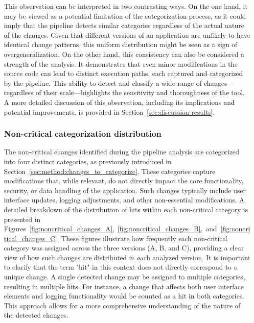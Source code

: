 This observation can be interpreted in two contrasting ways. On the one hand, it may be viewed as a potential limitation of the categorization process, as it could imply that the pipeline detects similar categories regardless of the actual nature of the changes. Given that different versions of an application are unlikely to have identical change patterns, this uniform distribution might be seen as a sign of overgeneralization.
On the other hand, this consistency can also be considered a strength of the analysis. It demonstrates that even minor modifications in the source code can lead to distinct execution paths, each captured and categorized by the pipeline. This ability to detect and classify a wide range of changes—regardless of their scale—highlights the sensitivity and thoroughness of the tool.
A more detailed discussion of this observation, including its implications and potential improvements, is provided in Section~\ref{sec:discussion-results}.








\subsubsection{Non-critical categorization distribution}
The non-critical changes identified during the pipeline analysis are categorized into four distinct categories, as previously introduced in Section~\ref{sec:method:changes_to_categorize}. These categories capture modifications that, while relevant, do not directly impact the core functionality, security, or data handling of the application. Such changes typically include user interface updates, logging adjustments, and other non-essential modifications.
A detailed breakdown of the distribution of hits within each non-critical category is presented in Figures~\ref{fig:noncritical_changes_A},~\ref{fig:noncritical_changes_B},~and~\ref{fig:noncritical_changes_C}. These figures illustrate how frequently each non-critical category was assigned across the three versions (A, B, and C), providing a clear view of how such changes are distributed in each analyzed version.
It is important to clarify that the term "hit" in this context does not directly correspond to a unique change. A single detected change may be assigned to multiple categories, resulting in multiple hits. For instance, a change that affects both user interface elements and logging functionality would be counted as a hit in both categories. This approach allows for a more comprehensive understanding of the nature of the detected changes.


